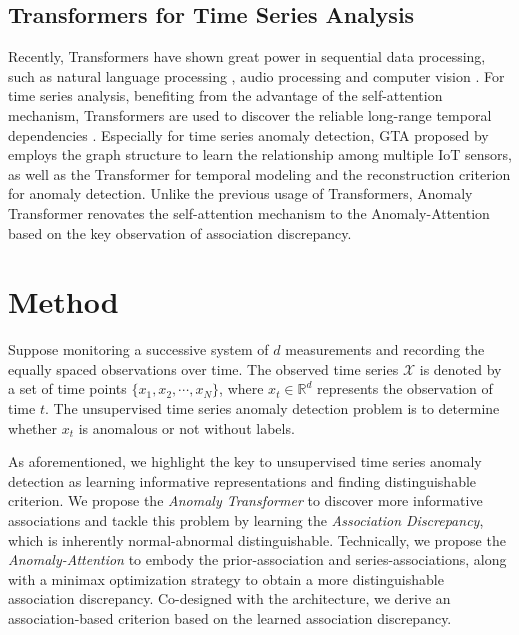 \documentclass{article} %
\begin{document}
\vspace{-5pt}
\subsection{Transformers for Time Series Analysis}
\vspace{-5pt}
Recently, Transformers \citep{NIPS2017_3f5ee243} have shown great power in sequential data processing, such as natural language processing \citep{Devlin2019BERTPO,NEURIPS2020_1457c0d6}, audio processing \citep{huang2018music} and computer vision \citep{dosovitskiy2021an,liu2021Swin}. For time series analysis, benefiting from the advantage of the self-attention mechanism, Transformers are used to discover the reliable long-range temporal dependencies \citep{kitaev2020reformer,2019Enhancing,haoyietal-informer-2021,wu2021autoformer}. Especially for time series anomaly detection, GTA proposed by \cite{Chen2021LearningGS} employs the graph structure to learn the relationship among multiple IoT sensors, as well as the Transformer for temporal modeling and the reconstruction criterion for anomaly detection. Unlike the previous usage of Transformers, Anomaly Transformer renovates the self-attention mechanism to the Anomaly-Attention based on the key observation of association discrepancy.

\vspace{-10pt}
\section{Method}
\vspace{-5pt}
Suppose monitoring a successive system of $d$ measurements and recording the equally spaced observations over time. The observed time series $\mathcal{X}$ is denoted by a set of time points $\{x_1, x_2, \cdots,x_N\}$, where $x_{t}\in\mathbb{R}^{d}$ represents the observation of time $t$. The unsupervised time series anomaly detection problem is to determine whether $x_t$ is anomalous or not without labels. 

As aforementioned, we highlight the key to unsupervised time series anomaly detection as learning informative representations and finding distinguishable criterion. We propose the \emph{Anomaly Transformer} to discover more informative associations and tackle this problem by learning the \emph{Association Discrepancy}, which is inherently normal-abnormal distinguishable. Technically, we propose the \emph{Anomaly-Attention} to embody the prior-association and series-associations, along with a minimax optimization strategy to obtain a more distinguishable association discrepancy. Co-designed with the architecture, we derive an association-based criterion based on the learned association discrepancy.
\end{document}
